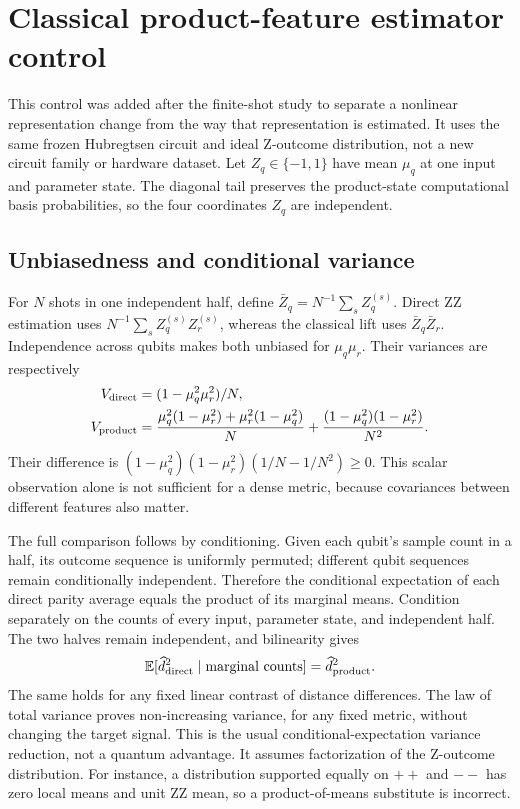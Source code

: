 \section{Classical product-feature estimator control}
\label{app:productcontrol}
This control was added after the finite-shot study to separate a
nonlinear representation change from the way that representation
is estimated. It uses the same frozen Hubregtsen circuit and ideal
Z-outcome distribution, not a new circuit family or hardware dataset.
Let $Z_q\in\{-1,1\}$ have mean $\mu_q$ at one input and parameter
state. The diagonal tail preserves the product-state computational
basis probabilities, so the four coordinates $Z_q$ are independent.

\subsection{Unbiasedness and conditional variance}
For $N$ shots in one independent half, define
$\bar Z_q=N^{-1}\sum_sZ_q^{(s)}$. Direct ZZ estimation uses
$N^{-1}\sum_sZ_q^{(s)}Z_r^{(s)}$, whereas the classical lift uses
$\bar Z_q\bar Z_r$. Independence across qubits makes both unbiased
for $\mu_q\mu_r$. Their variances are respectively
\begin{align}
 V_{\rm direct}&=(1-\mu_q^2\mu_r^2)/N,\\
 V_{\rm product}&=\frac{\mu_q^2(1-\mu_r^2)+\mu_r^2(1-\mu_q^2)}{N}
 +\frac{(1-\mu_q^2)(1-\mu_r^2)}{N^2}.
\end{align}
Their difference is
$(1-\mu_q^2)(1-\mu_r^2)(1/N-1/N^2)\ge0$.
This scalar observation alone is not sufficient for a dense metric,
because covariances between different features also matter.

The full comparison follows by conditioning. Given each qubit's
sample count in a half, its outcome sequence is uniformly permuted;
different qubit sequences remain conditionally independent. Therefore
the conditional expectation of each direct parity average equals the
product of its marginal means. Condition separately on the counts
of every input, parameter state, and independent half. The two halves
remain independent, and bilinearity gives
\begin{equation}
 \mathbb E[\widehat d^2_{\rm direct}\mid\text{marginal counts}]
 =\widehat d^2_{\rm product}.
\end{equation}
The same holds for any fixed linear contrast of distance differences.
The law of total variance proves non-increasing variance, for any
fixed metric, without changing the target signal. This is the usual
conditional-expectation variance reduction, not a quantum advantage.
It assumes factorization of the Z-outcome distribution. For instance,
a distribution supported equally on $++$ and $--$ has zero local
means and unit ZZ mean, so a product-of-means substitute is incorrect.

